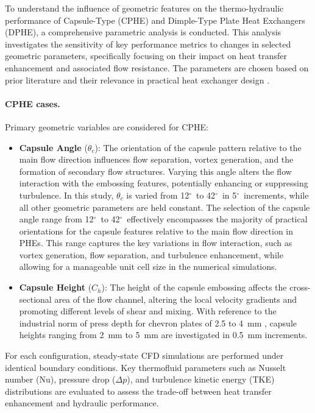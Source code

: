 \documentclass[review,12pt]{elsarticle}
\newcommand{\degree}{\ensuremath{^\circ}}
\begin{document}
To understand the influence of geometric features on the thermo-hydraulic performance of Capsule-Type (CPHE) and Dimple-Type Plate Heat Exchangers (DPHE), a comprehensive parametric analysis is conducted. This analysis investigates the sensitivity of key performance metrics to changes in selected geometric parameters, specifically focusing on their impact on heat transfer enhancement and associated flow resistance. The parameters are chosen based on prior literature and their relevance in practical heat exchanger design \citep{hamedi2024, jiang2019, jiang2019a, jiang2020, soman2019, mocnik2024, jing2019}.

\paragraph{CPHE cases.}
Primary geometric variables are considered for CPHE:

\begin{itemize}
  \item \textbf{Capsule Angle} ($\theta_c$): The orientation of the capsule pattern relative to the main flow direction influences flow separation, vortex generation, and the formation of secondary flow structures. Varying this angle alters the flow interaction with the embossing features, potentially enhancing or suppressing turbulence. In this study, $\theta_c$ is varied from 12\degree\ to 42\degree\ in 5\degree\ increments, while all other geometric parameters are held constant. The selection of the capsule angle range from 12\degree\ to 42\degree\ effectively encompasses the majority of practical orientations for the capsule features relative to the main flow direction in PHEs. This range captures the key variations in flow interaction, such as vortex generation, flow separation, and turbulence enhancement, while allowing for a manageable unit cell size in the numerical simulations.

  \item \textbf{Capsule Height} ($C_h$): The height of the capsule embossing affects the cross-sectional area of the flow channel, altering the local velocity gradients and promoting different levels of shear and mixing. With reference to the industrial norm of press depth for chevron plates of 2.5 to 4~mm \citep{laval2022}, capsule heights ranging from 2~mm to 5~mm are investigated in 0.5~mm increments.
\end{itemize}

For each configuration, steady-state CFD simulations are performed under identical boundary conditions. Key thermofluid parameters such as Nusselt number (Nu), pressure drop ($\Delta p$), and turbulence kinetic energy (TKE) distributions are evaluated to assess the trade-off between heat transfer enhancement and hydraulic performance.
\end{document}
